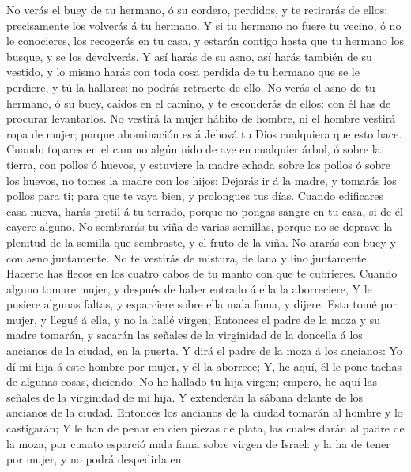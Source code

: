  No verás el buey de tu hermano, ó su cordero, perdidos, y
te retirarás de ellos: precisamente los volverás á tu hermano.
 Y si tu hermano no fuere tu vecino, ó no le conocieres, los
recogerás en tu casa, y estarán contigo hasta que tu hermano los busque,
y se los devolverás.  Y así harás de su asno, así harás
también de su vestido, y lo mismo harás con toda cosa perdida de tu
hermano que se le perdiere, y tú la hallares: no podrás retraerte de
ello.  No verás el asno de tu hermano, ó su buey, caídos en
el camino, y te esconderás de ellos: con él has de procurar levantarlos.
 No vestirá la mujer hábito de hombre, ni el hombre vestirá
ropa de mujer; porque abominación es á Jehová tu Dios cualquiera que
esto hace.  Cuando topares en el camino algún nido de ave en
cualquier árbol, ó sobre la tierra, con pollos ó huevos, y estuviere la
madre echada sobre los pollos ó sobre los huevos, no tomes la madre con
los hijos:  Dejarás ir á la madre, y tomarás los pollos para
ti; para que te vaya bien, y prolongues tus días.  Cuando
edificares casa nueva, harás pretil á tu terrado, porque no pongas
sangre en tu casa, si de él cayere alguno.  No sembrarás tu
viña de varias semillas, porque no se deprave la plenitud de la semilla
que sembraste, y el fruto de la viña.  No ararás con buey y
con asno juntamente.  No te vestirás de mistura, de lana y
lino juntamente.  Hacerte has flecos en los cuatro cabos de
tu manto con que te cubrieres.  Cuando alguno tomare mujer,
y después de haber entrado á ella la aborreciere,  Y le
pusiere algunas faltas, y esparciere sobre ella mala fama, y dijere:
Esta tomé por mujer, y llegué á ella, y no la hallé virgen;
 Entonces el padre de la moza y su madre tomarán, y sacarán
las señales de la virginidad de la doncella á los ancianos de la ciudad,
en la puerta.  Y dirá el padre de la moza á los ancianos:
Yo dí mi hija á este hombre por mujer, y él la aborrece; 
Y, he aquí, él le pone tachas de algunas cosas, diciendo: No he hallado
tu hija virgen; empero, he aquí las señales de la virginidad de mi hija.
Y extenderán la sábana delante de los ancianos de la ciudad.
 Entonces los ancianos de la ciudad tomarán al hombre y lo
castigarán;  Y le han de penar en cien piezas de plata, las
cuales darán al padre de la moza, por cuanto esparció mala fama sobre
virgen de Israel: y la ha de tener por mujer, y no podrá despedirla en
